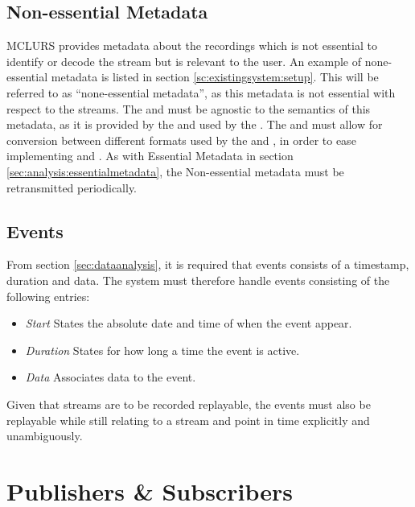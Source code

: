 \subsection{Non-essential Metadata} \label {sec:analysis:nonessentialmetadata}
\ac{MCLURS} provides metadata about the recordings which is not essential to identify or decode the stream but is relevant to the user. An example of none-essential metadata is listed in section \ref{sc:existingsystem:setup}. This will be referred to as ``none-essential metadata'', as this metadata is not essential with respect to the streams.
The  and  must be agnostic to the semantics of this metadata, as it is provided by the  and used by the . The  and  must allow for conversion between different formats used by the  and , in order to ease implementing  and . As with Essential Metadata in section \ref{sec:analysis:essentialmetadata}, the Non-essential metadata must be retransmitted periodically.




\subsection{Events} \label{sec:analysis:event}
From section \ref{sec:dataanalysis}, it is required that events consists of a timestamp, duration and data. The system must therefore handle events consisting of the following entries:
\begin{itemize}
	\item \textit{Start} States the absolute date and time of when the event appear. 
	\item \textit{Duration} States for how long a time the event is active.
	\item \textit{Data} Associates data to the event. 
\end{itemize}

Given that streams are to be recorded replayable, the events must also be replayable while still relating to a stream and point in time explicitly and unambiguously.


\section{Publishers \& Subscribers} \label{sec:analysis:pubsub}
